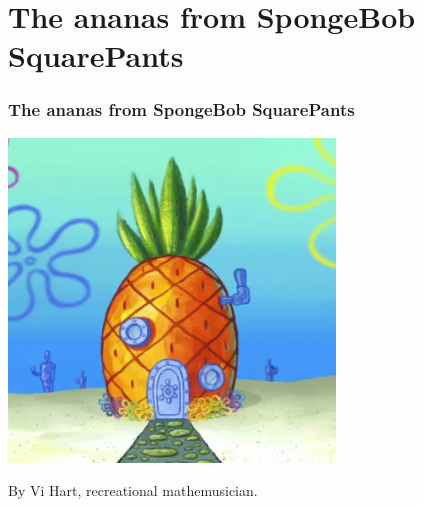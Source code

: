 \documentclass[12pt,compress,english,utf8,t]{beamer}
\begin{document}
\section{The ananas from SpongeBob SquarePants}

\begin{frame}\frametitle{The ananas from SpongeBob SquarePants}
  \centering
  \includegraphics[width=0.65\textwidth]{spongebob-ananas}
  \medskip

  By Vi Hart, recreational mathemusician.
  \par
\end{frame}
\end{document}
